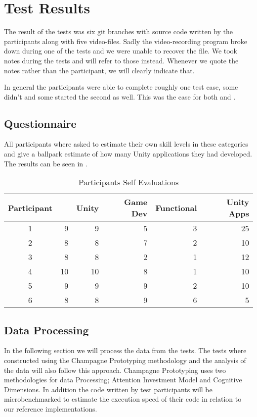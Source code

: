 \section{Test Results} \label{sec:test-results}
The result of the tests was six git branches with source code written by the participants along with five video-files. Sadly the video-recording program broke down during one of the tests and we were unable to recover the file. We took notes during the tests and will refer to those instead. Whenever we quote the notes rather than the participant, we will clearly indicate that.


In general the participants were able to complete roughly one test case, some didn't and some started the second as well. This was the case for both \fsh and \csh.

\subsection{Questionnaire}
All participants where asked to estimate their own skill levels in these categories and give a ballpark estimate of how many Unity applications they had developed. The results can be seen in .

\begin{table}[H]
\begin{tabular}{| c | r | r | r | r | r |}
	\hline
	\textbf{Participant}&\textbf{\csh}&\textbf{Unity}&\textbf{Game Dev}&\textbf{Functional}&\textbf{Unity Apps} \\ \hline
	1 & 9 & 9 & 5 & 3 & 25 \\ \hline
	2 & 8 & 8 & 7 & 2 & 10 \\ \hline
	3 & 8 & 8 & 2 & 1 & 12 \\ \hline
	4 & 10 & 10 & 8 & 1 & 10 \\ \hline
	5 & 9 & 9 & 9 & 2 & 10 \\ \hline
	6 & 8 & 8 & 9 & 6 & 5 \\ \hline
\end{tabular}
\caption{Participants Self Evaluations}
\label{tab:participant-scores}
\end{table}

\subsection{Data Processing}
In the following section we will process the data from the tests. The tests where constructed using the Champagne Prototyping methodology and the analysis of the data will also follow this approach. Champagne Prototyping uses two methodologies for data Processing; Attention Investment Model and Cognitive Dimensions. In addition the code written by test participants will be microbenchmarked to estimate the execution speed of their code in relation to our reference implementations.

